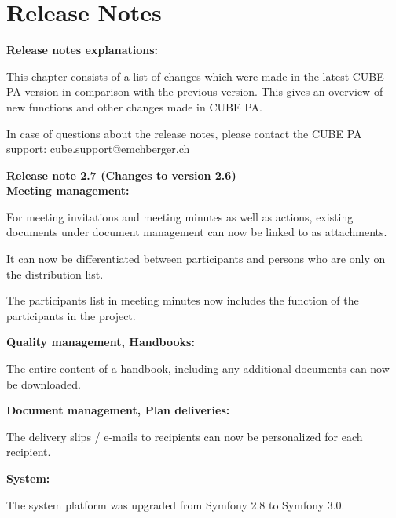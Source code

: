 
\clearpage
\section{Release Notes}

\textbf{Release notes explanations:}

\vspace{\baselineskip}

This chapter consists of a list of changes which were made in the latest CUBE PA version in comparison with the previous version. This gives an overview of new functions and other changes made in CUBE PA.

\vspace{\baselineskip}

In case of questions about the release notes, please contact the CUBE PA support: {\color{red} cube.support@emchberger.ch}

\vspace{\baselineskip}


\textbf{Release note 2.7 (Changes to version 2.6)} \\
\textbf{Meeting management:}
\begin{compactitem}
  \item For meeting invitations and meeting minutes as well as actions, existing documents under document management can now be linked to as attachments.
	\item It can now be differentiated between participants and persons who are only on the distribution list.
	\item The participants list in meeting minutes now includes the function of the participants in the project.
\end{compactitem}
\textbf{Quality management, Handbooks:}
\begin{compactitem}
  \item The entire content of a handbook, including any additional documents can now be downloaded.
\end{compactitem}
\textbf{Document management, Plan deliveries:}
\begin{compactitem}
  \item The delivery slips / e-mails to recipients can now be personalized for each recipient.
\end{compactitem}
\textbf{System:}
\begin{compactitem}
  \item The system platform was upgraded from Symfony 2.8 to Symfony 3.0.
\end{compactitem}
 

